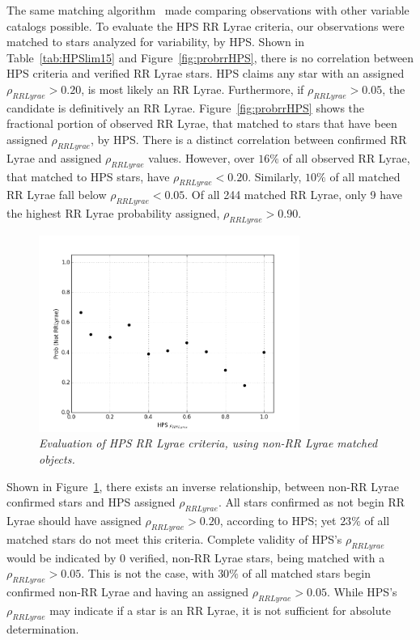 \documentclass[aps,prb,twocolumn,superscriptaddress]{revtex4-1}
\begin{document}
The same matching algorithm~\cite{gri} made comparing observations with other variable catalogs possible.  
To evaluate the HPS RR Lyrae criteria, our observations were matched to stars analyzed for variability, by HPS.  
Shown in Table~\ref{tab:HPSlim15} and Figure~\ref{fig:probrrHPS}, there is no correlation between HPS criteria and 
verified RR Lyrae stars.  HPS claims any star with an assigned $\rho_{RRLyrae} > 0.20$, is most likely an RR Lyrae.  Furthermore, 
if $\rho_{RRLyrae} > 0.05$, the candidate is definitively an RR Lyrae.  Figure~\ref{fig:probrrHPS} shows the fractional 
portion of observed RR Lyrae, that matched to stars that have been assigned $\rho_{RRLyrae}$, by HPS.
There is a distinct correlation between confirmed RR Lyrae and assigned $\rho_{RRLyrae}$ values.  However, over $16\%$ of 
all observed RR Lyrae, that matched to HPS stars, have $\rho_{RRLyrae} < 0.20$.  Similarly, $10\%$ of all matched RR Lyrae 
fall below $\rho_{RRLyrae} < 0.05$.  Of all 244 matched RR Lyrae, only 9 have the highest RR Lyrae 
probability assigned, $\rho_{RRLyrae} > 0.90$.


\begin{figure}[H]
 \centering
 	\includegraphics[width=3.35in]{figures/NEW/probnotrr_vs_HPS.png}
 \caption{\it \small{Evaluation of HPS RR Lyrae criteria, using non-RR Lyrae matched objects.}}
 \label{fig:probnotrrHPS}
\end{figure}



Shown in Figure~\ref{fig:probnotrrHPS}, there exists an inverse relationship, between non-RR Lyrae confirmed stars and HPS 
assigned $\rho_{RRLyrae}$.   
All stars confirmed as not begin RR Lyrae should have assigned $\rho_{RRLyrae} > 0.20$, according to HPS; yet $23\%$ of 
all matched stars do not meet this criteria.  Complete validity of HPS's $\rho_{RRLyrae}$ would be indicated by 0 verified, 
non-RR Lyrae stars, being matched with a $\rho_{RRLyrae} > 0.05$.  This is not the case, with $30\%$ of all matched stars begin 
confirmed non-RR Lyrae and having an assigned $\rho_{RRLyrae} > 0.05$.  While HPS's $\rho_{RRLyrae}$ may indicate if a star is 
an RR Lyrae, it is not sufficient for absolute determination.
\end{document}
